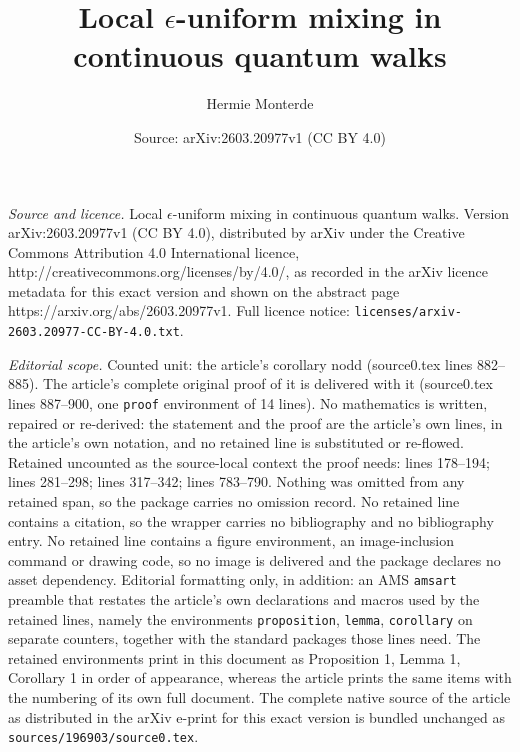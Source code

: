 \documentclass[10pt,a4paper]{amsart}
\title{Local $\epsilon$-uniform mixing in continuous quantum walks}
\author{Hermie Monterde}
\date{Source: arXiv:2603.20977v1 (CC BY 4.0)}
\begin{document}
\maketitle

\noindent\emph{Source and licence.} Local $\epsilon$-uniform mixing in continuous quantum walks. Version arXiv:2603.20977v1 (CC BY 4.0), distributed by arXiv under the Creative Commons Attribution 4.0 International licence, http://creativecommons.org/licenses/by/4.0/, as recorded in the arXiv licence metadata for this exact version and shown on the abstract page https://arxiv.org/abs/2603.20977v1. Full licence notice: \texttt{licenses/arxiv-2603.20977-CC-BY-4.0.txt}.\par\smallskip

\noindent\textit{Editorial scope.} Counted unit: the article's corollary nodd (source0.tex lines 882--885). The article's complete original proof of it is delivered with it (source0.tex lines 887--900, one \texttt{proof} environment of 14 lines). No mathematics is written, repaired or re-derived: the statement and the proof are the article's own lines, in the article's own notation, and no retained line is substituted or re-flowed.  Retained uncounted as the source-local context the proof needs: lines 178--194; lines 281--298; lines 317--342; lines 783--790.  Nothing was omitted from any retained span, so the package carries no omission record.  No retained line contains a citation, so the wrapper carries no bibliography and no bibliography entry.  No retained line contains a figure environment, an image-inclusion command or drawing code, so no image is delivered and the package declares no asset dependency.  Editorial formatting only, in addition: an AMS \texttt{amsart} preamble that restates the article's own declarations and macros used by the retained lines, namely the environments \texttt{proposition}, \texttt{lemma}, \texttt{corollary} on separate counters, together with the standard packages those lines need.  The retained environments print in this document as Proposition 1, Lemma 1, Corollary 1 in order of appearance, whereas the article prints the same items with the numbering of its own full document.  The complete native source of the article as distributed in the arXiv e-print for this exact version is bundled unchanged as \texttt{sources/196903/source0.tex}.
\end{document}
